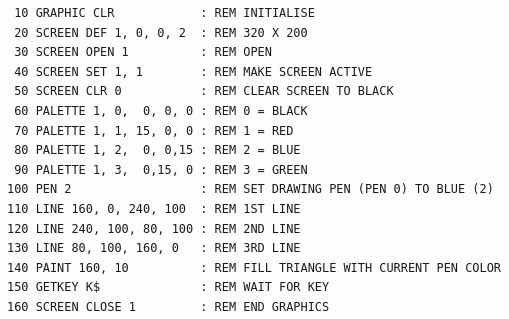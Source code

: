 \begin{description}[leftmargin=2cm,style=nextline]
\begin{tcolorbox}[colback=black,coltext=white]
\verbatimfont{\codefont}
\begin{verbatim}
 10 GRAPHIC CLR            : REM INITIALISE
 20 SCREEN DEF 1, 0, 0, 2  : REM 320 X 200
 30 SCREEN OPEN 1          : REM OPEN
 40 SCREEN SET 1, 1        : REM MAKE SCREEN ACTIVE
 50 SCREEN CLR 0           : REM CLEAR SCREEN TO BLACK
 60 PALETTE 1, 0,  0, 0, 0 : REM 0 = BLACK
 70 PALETTE 1, 1, 15, 0, 0 : REM 1 = RED
 80 PALETTE 1, 2,  0, 0,15 : REM 2 = BLUE
 90 PALETTE 1, 3,  0,15, 0 : REM 3 = GREEN
100 PEN 2                  : REM SET DRAWING PEN (PEN 0) TO BLUE (2)
110 LINE 160, 0, 240, 100  : REM 1ST LINE
120 LINE 240, 100, 80, 100 : REM 2ND LINE
130 LINE 80, 100, 160, 0   : REM 3RD LINE
140 PAINT 160, 10          : REM FILL TRIANGLE WITH CURRENT PEN COLOR
150 GETKEY K$              : REM WAIT FOR KEY
160 SCREEN CLOSE 1         : REM END GRAPHICS
\end{verbatim}
\end{tcolorbox}
\end{description}


\newpage
